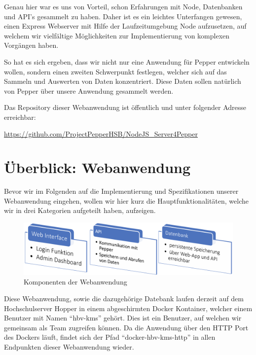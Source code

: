Genau hier war es uns von Vorteil, schon Erfahrungen mit Node, Datenbanken und API's gesammelt zu haben.
Daher ist es ein leichtes Unterfangen gewesen, einen Express Webserver mit Hilfe der Laufzeitumgebung Node aufzusetzen,
auf welchem wir vielfältige Möglichkeiten zur Implementierung von komplexen Vorgängen haben.

So hat es sich ergeben, dass wir nicht nur eine Anwendung für Pepper entwickeln wollen, sondern einen
zweiten Schwerpunkt festlegen, welcher sich auf das Sammeln und Auswerten von Daten konzentriert. Diese Daten
sollen natürlich von Pepper über unsere Anwendung gesammelt werden.

Das Repository dieser Webanwendung ist öffentlich und unter folgender Adresse erreichbar:

\href{https://github.com/ProjectPepperHSB/NodeJS\_Server4Pepper}{https://github.com/ProjectPepperHSB/NodeJS\_Server4Pepper}

\section{Überblick: Webanwendung}
\label{sec:nodechapter-ueberblick}
Bevor wir im Folgenden auf die Implementierung und Spezifikationen unserer Webanwendung eingehen, wollen wir hier kurz
die Hauptfunktionalitäten, welche wir in drei Kategorien aufgeteilt haben, aufzeigen.

\begin{figure}[H]
    \includegraphics[width=\textwidth]{Figures/NodeChapter/WebAppComponents.png}
    \caption{Komponenten der Webanwendung}
    \label{fig:webappcomponents}
    \centering
\end{figure}

Diese Webanwendung, sowie die dazugehörige Datebank laufen derzeit auf dem Hochschulserver Hopper in einem
abgeschirmten Docker Kontainer, welcher einem Benutzer mit Namen ``hbv-kms'' gehört. Dies ist ein
Benutzer, auf welchen wir gemeinsam als Team zugreifen können. Da die Anwendung über den HTTP
Port des Dockers läuft, findet sich der Pfad ``docker-hbv-kms-http'' in allen Endpunkten dieser Webanwendung wieder.

